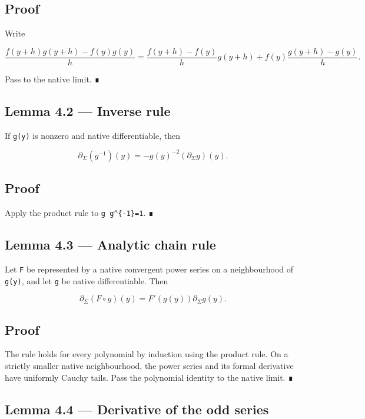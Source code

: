 \hypertarget{proof-2}{%
\subsection{Proof}\label{proof-2}}

Write

\[
\frac{f(y+h)g(y+h)-f(y)g(y)}{h}
=
\frac{f(y+h)-f(y)}{h}g(y+h)
+f(y)\frac{g(y+h)-g(y)}{h}.
\]

Pass to the native limit. ∎

\hypertarget{lemma-4.2-inverse-rule}{%
\subsection{Lemma 4.2 --- Inverse rule}\label{lemma-4.2-inverse-rule}}

If \texttt{g(y)} is nonzero and native differentiable, then

\[
\partial_\Sigma(g^{-1})(y)
=-g(y)^{-2}(\partial_\Sigma g)(y).
\]

\hypertarget{proof-3}{%
\subsection{Proof}\label{proof-3}}

Apply the product rule to \texttt{g\ g\^{}\{-1\}=1}. ∎

\hypertarget{lemma-4.3-analytic-chain-rule}{%
\subsection{Lemma 4.3 --- Analytic chain rule}\label{lemma-4.3-analytic-chain-rule}}

Let \texttt{F} be represented by a native convergent power series on a neighbourhood
of \texttt{g(y)}, and let \texttt{g} be native differentiable. Then

\[
\partial_\Sigma(F\circ g)(y)
=F'(g(y))\partial_\Sigma g(y).
\]

\hypertarget{proof-4}{%
\subsection{Proof}\label{proof-4}}

The rule holds for every polynomial by induction using the product rule. On a
strictly smaller native neighbourhood, the power series and its formal
derivative have uniformly Cauchy tails. Pass the polynomial identity to the
native limit. ∎

\hypertarget{lemma-4.4-derivative-of-the-odd-series}{%
\subsection{Lemma 4.4 --- Derivative of the odd series}\label{lemma-4.4-derivative-of-the-odd-series}}

